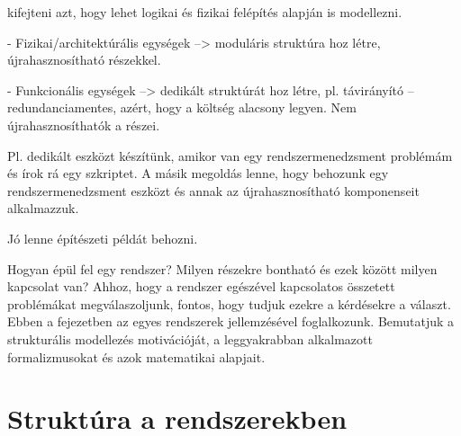 
\graphicspath{ {./struktura-alapu-modellezes/figures/} }

\newcommand{\yedscale}{0.7}


\begin{megjegyzes}
	kifejteni azt, hogy lehet logikai és fizikai felépítés alapján is modellezni.
	
	- Fizikai/architektúrális egységek --> moduláris struktúra hoz létre, újrahasznosítható részekkel.
	
	- Funkcionális egységek --> dedikált struktúrát hoz létre, pl. távirányító -- redundanciamentes, azért, hogy a költség alacsony legyen. Nem újrahasznosíthatók a részei.
	
	Pl. dedikált eszközt készítünk, amikor van egy rendszermenedzsment problémám és írok rá egy szkriptet. A másik megoldás lenne, hogy behozunk egy rendszermenedzsment eszközt és annak az újrahasznosítható komponenseit alkalmazzuk.
	
	Jó lenne építészeti példát behozni.
\end{megjegyzes}

Hogyan épül fel egy rendszer? Milyen részekre bontható és ezek között milyen kapcsolat van? Ahhoz, hogy a rendszer egészével kapcsolatos összetett problémákat megválaszoljunk, fontos, hogy tudjuk ezekre a kérdésekre a választ. Ebben a fejezetben az egyes rendszerek  jellemzésével foglalkozunk. Bemutatjuk a strukturális modellezés motivációját, a leggyakrabban alkalmazott formalizmusokat és azok matematikai alapjait.


\section{Struktúra a rendszerekben}

